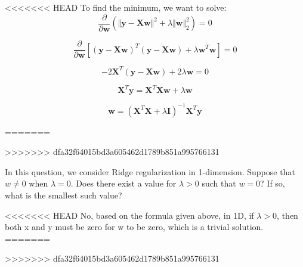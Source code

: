 \begin{subsolution}
<<<<<<< HEAD
  To find the minimum, we want to solve:
  \begin{equation}
  \frac{\partial}{\partial \mathbf{w}} (\Vert\mathbf{y} - \mathbf{X}\mathbf{w}\Vert^2 + \lambda\Vert\mathbf{w}\Vert_2^2 ) = 0
  \end{equation}

  \begin{equation}
    \frac{\partial}{\partial \mathbf{w}} [(\mathbf{y} - \mathbf{X}\mathbf{w})^{T}(\mathbf{y} - \mathbf{X}\mathbf{w}) + \lambda\mathbf{w}^T\mathbf{w} ] = 0
  \end{equation}

  \begin{equation}
    - 2 \mathbf{X}^T (\mathbf{y} - \mathbf{X}\mathbf{w}) + 2\lambda \mathbf{w} = 0
  \end{equation}

  \begin{equation}
    \mathbf{X}^T\mathbf{y} = \mathbf{X}^T\mathbf{X}\mathbf{w} + \lambda \mathbf{w}
  \end{equation}

  \begin{equation}
    \mathbf{w} = (\mathbf{X}^T\mathbf{X} + \lambda \mathbf{I}) ^{-1} \mathbf{X}^T\mathbf{y} 
  \end{equation}

  
=======
 
>>>>>>> dfa32f64015bd3a605462d1789b851a995766131
\end{subsolution}

\subproblem In this question, we consider Ridge regularization in 1-dimension. Suppose that $w \neq 0$ when $\lambda = 0$. Does there exist a value for $\lambda > 0$ such that $w = 0$? If so, what is the smallest such value?

\begin{subsolution}
<<<<<<< HEAD
  No, based on the formula given above, in 1D, if $\lambda > 0$, then both x and y must be zero for w to be zero, which is a trivial solution.
=======

>>>>>>> dfa32f64015bd3a605462d1789b851a995766131
\end{subsolution}



